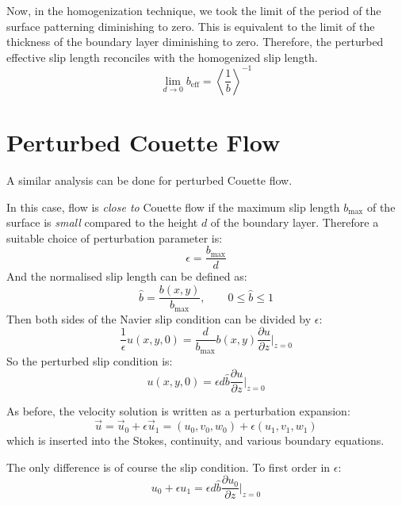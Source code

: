 \documentclass[12pt, a4paper, twoside, openright]{book}
\newcommand{\beff}{\ensuremath{b_{\mathrm{eff}}}}
\newcommand{\bmax}{\ensuremath{b_{\mathrm{max}}}}
\begin{document}
Now, in the homogenization technique, we took the limit of the period of the surface patterning diminishing to zero.  This is equivalent to the limit of the thickness of the boundary layer diminishing to zero.  Therefore, the perturbed effective slip length reconciles with the homogenized slip length.
\begin{equation}
\lim_{d \to 0} \beff = \left< \frac{1}{b} \right>^{-1}
\end{equation}

\section*{Perturbed Couette Flow}

A similar analysis can be done for perturbed Couette flow.

In this case, flow is \emph{close to} Couette flow if the maximum slip length $\bmax$ of the surface is \emph{small} compared to the height $d$ of the boundary layer.  Therefore a suitable choice of perturbation parameter is:
\begin{equation}
\epsilon = \frac{\bmax}{d}
\end{equation} 
And the normalised slip length can be defined as:
\begin{equation}
\hat{b} = \frac{b(x,y)}{\bmax}, \qquad 0 \leq \hat{b} \leq 1
\end{equation}
Then both sides of the Navier slip condition can be divided by $\epsilon$:
\begin{equation}
\frac{1}{\epsilon} u(x,y,0) = \frac{d}{\bmax} b(x,y) \frac{\partial u}{\partial z} \rvert_{z=0}
\end{equation}
So the perturbed slip condition is:
\begin{equation}
u(x,y,0) = \epsilon d \hat{b} \frac{\partial u}{\partial z} \rvert_{z=0}
\end{equation}

As before, the velocity solution is written as a perturbation expansion:
\begin{equation}
\vec{u} = \vec{u}_0 + \epsilon \vec{u}_1 = (u_0, v_0, w_0) + \epsilon(u_1, v_1, w_1)
\end{equation}
which is inserted into the Stokes, continuity, and various boundary equations.

The only difference is of course the slip condition.  To first order in $\epsilon$:
\begin{equation}
u_0 + \epsilon u_1 = \epsilon d \hat{b} \frac{\partial u_0}{\partial z} \rvert_{z=0}
\end{equation}
\end{document}

